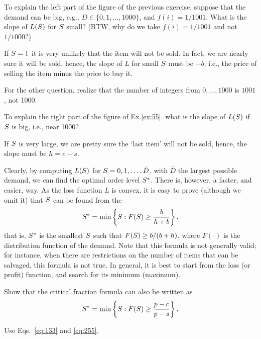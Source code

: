 \begin{exercise}[Continuation]
To explain the left part of the figure of the previous exercise, suppose that the demand can be big, e.g., $D\in\{0,1,\ldots, 1000\}$, and $f(i) = 1/1001$. What is the slope of $L(S)$ for $S$ small? (BTW, why do we take $f(i)=1/1001$ and not $1/1000$?) 
\begin{solution}
  If $S=1$ it is very unlikely that the item will not be sold. In fact, we are nearly sure it will be sold, hence, the slope of $L$ for small $S$ must be $-b$, i.e., the price of selling the item minus the price to buy it.

For the other question, realize that the number of integers from $0, \ldots, 1000$ is $1001$, not 1000.
\end{solution}
\end{exercise}
 
\begin{exercise}[Continuation] To explain the right  part of the figure of Ex.\ref{ex:55}.
what is the slope of $L(S)$ if $S$ is big, i.e., near 1000? 
\begin{solution}
If $S$ is very large, we are pretty sure the `last item' will not be sold, hence, the slope must be $h=c-s$. 
\end{solution}
\end{exercise}

Clearly, by computing $L(S)$ for $S=0, 1, \ldots, \bar D$, with $\bar D$ the largest possible demand, we can find the optimal order level $S^*$. There is, however, a faster, and easier, way. As the loss function $L$ is convex, it is easy to prove (although we omit it) that 
$S$ can be found from the 
\begin{equation}\label{eq:255}
S^* = \min\left\{S : F(S)\geq \frac{b}{h+b}\right\},
\end{equation}
that is, $S^*$ is the smallest $S$ such that $F(S) \geq b/(b+h)$, where $F(\cdot)$ is the distribution function of the demand. Note that this formula is not generally valid; for instance, when there are restrictions on the number of items that can be salvaged, this formula is not true. In general, it is best to start from the loss (or profit) function, and search for its minimum (maximum).

\begin{exercise}
Show that the critical fraction formula can also be written as
\begin{equation*}
S^* = \min\left\{S : F(S)\geq \frac{p-c}{p-s}\right\},
\end{equation*}
\begin{solution}
Use Eqs.~\eqref{eq:133} and \eqref{eq:255}.
\end{solution}
\end{exercise}

